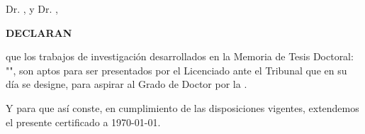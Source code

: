 \thispagestyle{empty}





\justifying
Dr. \textbf\thesisFirstSupervisor, y Dr. \textbf\thesisSecondSupervisor, 

\vspace{8ex}
\raggedright
\textbf{DECLARAN}
\vspace{4ex}

\justifying
que los trabajos de investigación desarrollados en la Memoria de Tesis Doctoral: "\textit{\thesisTitle}", son aptos para ser presentados por el Licenciado \thesisName \xspace ante el Tribunal que en su día se designe, para aspirar al Grado de Doctor por la \thesisUniversity. 


\vspace{2ex}
\justifying
Y para que así conste, en cumplimiento de las disposiciones vigentes, extendemos el presente certificado a \today.

